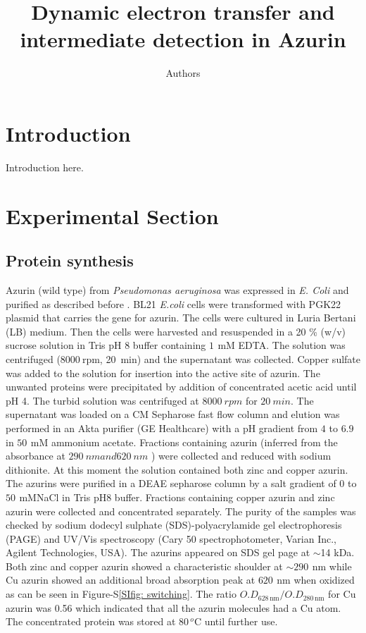 \documentclass[journal=jacsat,manuscript=article]{achemso}
\author{Authors}
\affiliation{Huygens-Kamerlingh Onnes Laboratory, Leiden University, RA, Leiden, The Netherlands}
\title[]
{Dynamic electron transfer and intermediate detection in Azurin}
\newcommand{\nm}{\ensuremath{\,\textrm{nm}}}
\newcommand{\mM}{\ensuremath{\,\textrm{mM}}}
\newcommand{\degree}{\ensuremath{\,^o\textrm{C}}}
\begin{document}
\section{Introduction}
Introduction here.
\section{Experimental Section}
\subsection{Protein synthesis}
Azurin (wild type) from \textit{Pseudomonas aeruginosa} was expressed in \textit{E. Coli} and purified as described 
before \citep{kamp1990purification}. BL21 \textit{E.coli} cells were transformed with PGK22 plasmid that carries the 
gene for azurin. The cells were cultured in Luria Bertani (LB) medium. Then the cells were harvested and resuspended 
in a 20 \% (w/v) sucrose solution in Tris pH 8 buffer containing $1~\mM$ EDTA. The solution was centrifuged 
($8000~$rpm, 20~min) and the supernatant was collected. Copper sulfate was added to the solution for insertion into the 
active site of azurin. The unwanted proteins were precipitated by addition of concentrated acetic acid until pH 4. 
The turbid solution was centrifuged at $8000~rpm$ for $20~min$. The supernatant was loaded on a CM Sepharose fast 
flow column and elution was performed in an Akta purifier (GE Healthcare) with a pH gradient from $4$ to $6.9$ in 
$50~\mM$ ammonium acetate. Fractions containing azurin (inferred from the absorbance at $290~nm and 620~nm$ ) were 
collected and reduced with sodium dithionite. At this moment the solution contained both zinc and copper azurin. 
The azurins were purified in a DEAE sepharose column by a salt gradient of 0 to $50~$\mM NaCl in Tris pH8 buffer. 
Fractions containing copper azurin and zinc azurin were collected and concentrated separately. The purity of the 
samples was checked by sodium dodecyl sulphate (SDS)-polyacrylamide gel electrophoresis (PAGE) and UV/Vis spectroscopy 
(Cary 50 spectrophotometer, Varian Inc., Agilent Technologies, USA). The azurins appeared on SDS gel page at $\sim$14 kDa. 
Both zinc and copper azurin showed a characteristic shoulder at ${\sim}290~\nm$ while Cu azurin showed an additional 
broad absorption peak at $620~\nm$ when oxidized as can be seen in Figure-S\ref{SIfig: switching}. 
The ratio $O.D_{628\nm}/O.D_{280\nm}$ for Cu azurin was 0.56 which indicated that all the azurin molecules had a Cu atom. 
The concentrated protein was stored at $80\degree$ until further use.
\end{document}
